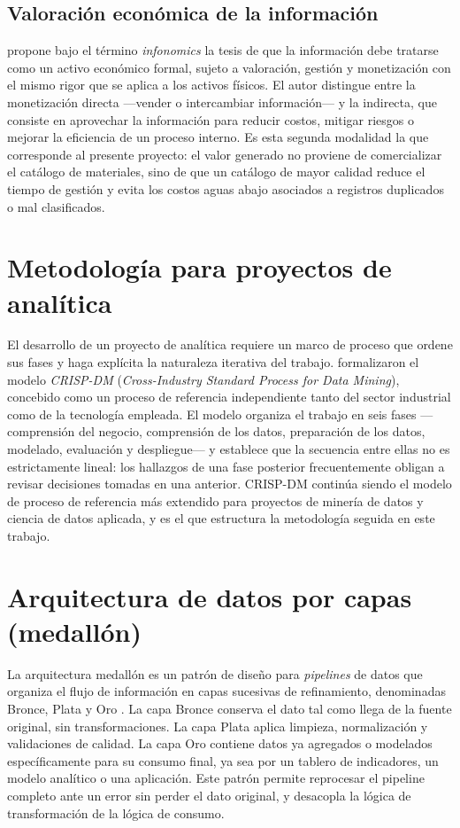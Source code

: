 \subsection{Valoración económica de la información}
 propone bajo el término \textit{infonomics} la tesis de que la información debe tratarse como un activo económico formal, sujeto a valoración, gestión y monetización con el mismo rigor que se aplica a los activos físicos. El autor distingue entre la monetización directa —vender o intercambiar información— y la indirecta, que consiste en aprovechar la información para reducir costos, mitigar riesgos o mejorar la eficiencia de un proceso interno. Es esta segunda modalidad la que corresponde al presente proyecto: el valor generado no proviene de comercializar el catálogo de materiales, sino de que un catálogo de mayor calidad reduce el tiempo de gestión y evita los costos aguas abajo asociados a registros duplicados o mal clasificados.

\section{Metodología para proyectos de analítica}
El desarrollo de un proyecto de analítica requiere un marco de proceso que ordene sus fases y haga explícita la naturaleza iterativa del trabajo.  formalizaron el modelo \textit{CRISP-DM} (\textit{Cross-Industry Standard Process for Data Mining}), concebido como un proceso de referencia independiente tanto del sector industrial como de la tecnología empleada. El modelo organiza el trabajo en seis fases —comprensión del negocio, comprensión de los datos, preparación de los datos, modelado, evaluación y despliegue— y establece que la secuencia entre ellas no es estrictamente lineal: los hallazgos de una fase posterior frecuentemente obligan a revisar decisiones tomadas en una anterior. CRISP-DM continúa siendo el modelo de proceso de referencia más extendido para proyectos de minería de datos y ciencia de datos aplicada, y es el que estructura la metodología seguida en este trabajo.

\section{Arquitectura de datos por capas (medallón)}
La arquitectura medallón es un patrón de diseño para \textit{pipelines} de datos que organiza el flujo de información en capas sucesivas de refinamiento, denominadas Bronce, Plata y Oro \cite{databricks2026}. La capa Bronce conserva el dato tal como llega de la fuente original, sin transformaciones. La capa Plata aplica limpieza, normalización y validaciones de calidad. La capa Oro contiene datos ya agregados o modelados específicamente para su consumo final, ya sea por un tablero de indicadores, un modelo analítico o una aplicación. Este patrón permite reprocesar el pipeline completo ante un error sin perder el dato original, y desacopla la lógica de transformación de la lógica de consumo.

